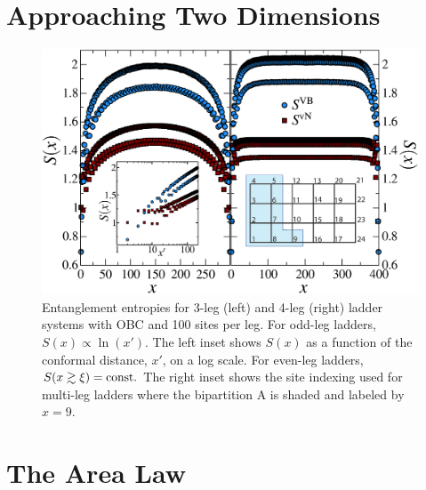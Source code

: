 \section{Approaching Two Dimensions}

\begin{figure} { \includegraphics[width=6.5in]{./figures/paper1/figure23new/fig23NEW.eps}
\caption[EEs for 3- \& 4-leg ladders]{
{\color{red}
Entanglement entropies for 3-leg (left)
and 4-leg (right) ladder systems with OBC and 100 sites per leg.  For
odd-leg ladders, $S(x)\propto\ln(x')$.  The left
inset shows $S(x)$ as a function of the conformal distance, $x'$, on a log
scale. For even-leg ladders, $S(x\gtrsim\xi)= {\rm const}.$
The right inset shows the site indexing used for multi-leg ladders where the
bipartition A is shaded and labeled by $x=9$. 
}
 \label{ladder} }} 
 \end{figure}

\section{The Area Law}

